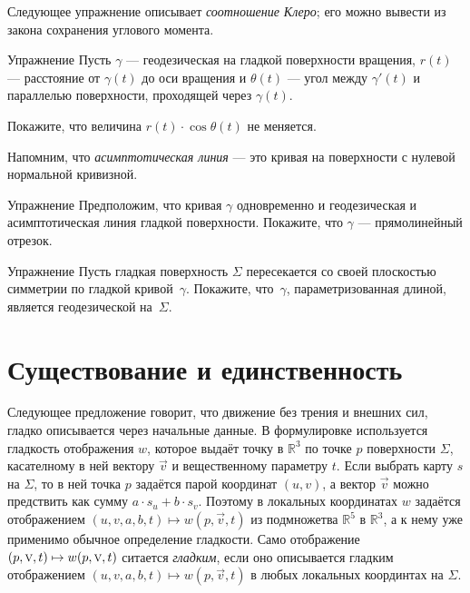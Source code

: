 {\sloppy

Следующее упражнение описывает \emph{соотношение Клеро};
его можно вывести из закона сохранения углового момента.

}

\begin{thm}{Упражнение}\label{ex:clairaut}
Пусть $\gamma$ --- геодезическая на гладкой поверхности вращения,
$r(t)$ --- расстояние от $\gamma(t)$ до оси вращения
и $\theta(t)$ --- угол между $\gamma'(t)$ и параллелью поверхности, проходящей через $\gamma(t)$. 

Покажите, что величина $r(t)\cdot \cos\theta(t)$ не меняется. 
\end{thm}

Напомним, что {}\emph{асимптотическая линия} --- это кривая на поверхности с нулевой нормальной кривизной.

\begin{thm}{Упражнение}\label{ex:asymptotic-geodesic}
Предположим, что кривая $\gamma$ одновременно и геодезическая и асимптотическая линия гладкой поверхности.
Покажите, что $\gamma$ --- прямолинейный отрезок.
\end{thm}

\begin{thm}{Упражнение}\label{ex:reflection-geodesic}
Пусть гладкая поверхность $\Sigma$ пересекается со своей плоскостью симметрии по гладкой кривой~$\gamma$.
Покажите, что~$\gamma$, параметризованная длиной, является геодезической на~$\Sigma$.
\end{thm}

\section{Существование и единственность}

{\sloppy

Следующее предложение говорит, что движение без трения и внешних сил, гладко описывается через начальные данные.
В формулировке используется гладкость отображения $w$, которое выдаёт точку в $\mathbb{R}^3$ по точке $p$ поверхности $\Sigma$, касателному в ней вектору $\vec{v}$ и вещественному параметру $t$.
Если выбрать карту $s$ на $\Sigma$, то в ней точка $p$ задаётся парой координат $(u,v)$, а вектор $\vec{v}$ можно предствить как сумму $a\cdot s_u+b\cdot s_v$.
Поэтому в локальных координатах $w$ задаётся отображением $(u,v,a,b,t)\mapsto w(p,\vec v,t)$ из подмножетва $\mathbb{R}^5$ в $\mathbb{R}^3$, а к нему уже применимо обычное определение гладкости.
Само отображение $(p,\vec v, t)\z\mapsto w(p,\vec v, t)$ ситается \emph{гладким}, если оно описывается гладким отображением $(u,v,a,b,t)\mapsto w(p,\vec v,t)$ в любых локальных координтах на $\Sigma$.

}

